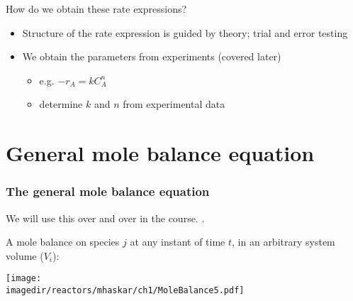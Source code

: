 \begin{frame}{How do we obtain these rate expressions?}
	
	\begin{itemize}
		\item	Structure of the rate expression is guided by theory; trial and error testing
		\vspace{12pt}
		\item	We obtain the parameters from experiments (covered later)
			\begin{itemize}
				\item	e.g. $-r_A = kC_A^n$
				\item	determine $k$ and $n$ from experimental data
			\end{itemize}
	\end{itemize}
\end{frame}

\section{General mole balance equation}
\begin{frame}\frametitle{The general mole balance equation} 
	We will use this over and over in the course. {\color{myOrange}{Let's understand this}}.

	\begin{exampleblock}{}
		A mole balance on species $j$ at any instant of time $t$, in an arbitrary system volume ($V_i$):
		\begin{center}
			\texttt{[image: \\imagedir/reactors/mhaskar/ch1/MoleBalance5.pdf]} 
		\end{center}
	\end{exampleblock}
\end{frame}

